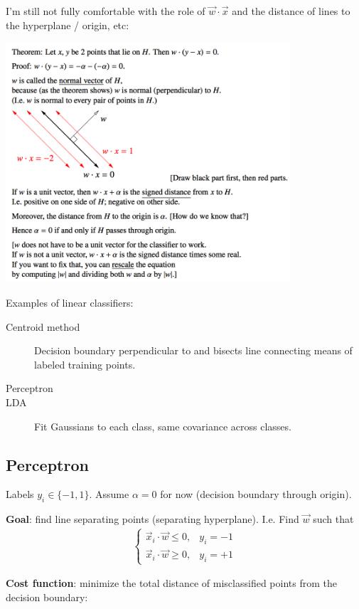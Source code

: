 \documentclass[12pt]{article}
\newcommand{\x}{\vec x}
\newcommand{\w}{\vec w}
\begin{document}
I'm still not fully comfortable with the role of $\w \cdot \x$ and the
distance of lines to the hyperplane / origin, etc:
\begin{mdframed}
  \includegraphics[width=300pt]{img/machine-learning-linear-decision-boundary-2.png}
\end{mdframed}
Examples of linear classifiers:
\begin{description}
\item[Centroid method] Decision boundary perpendicular to and bisects line
  connecting means of labeled training points.
\item[Perceptron]
\item[LDA] Fit Gaussians to each class, same covariance across classes.
\end{description}

\subsection*{Perceptron}

Labels $y_i \in \{-1, 1\}$. Assume $\alpha=0$ for now (decision boundary through origin).

\textbf{Goal}: find line separating points (separating hyperplane). I.e. Find $\w$ such that
\begin{align*}
  \begin{cases}
    \x_i \cdot \w \leq 0, &y_i = -1 \\
    \x_i \cdot \w \geq 0, &y_i = +1
  \end{cases}
\end{align*}

\textbf{Cost function}: minimize the total distance of misclassified points
from the decision boundary:
\end{document}
